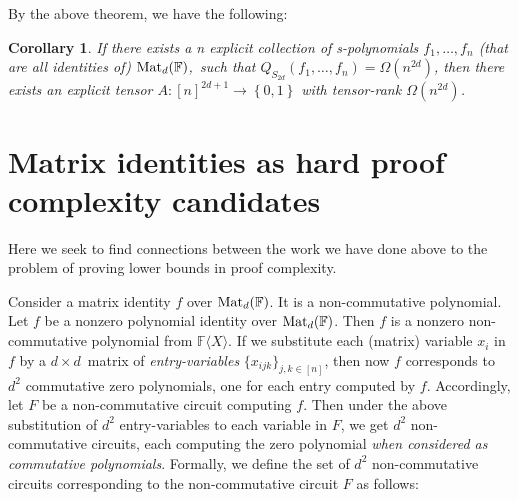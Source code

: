\documentclass[12pt,reqno]{article}
\newtheorem{corollary}[theorem]{Corollary}
\newcommand\F{\ensuremath{\mathbb F}}
\newcommand{\matd}{{\ensuremath{{\rm Mat}_d(\F)}}}
\newcommand{\freea}{\ensuremath{\F\langle X\rangle}}
\newcommand{\dbyd}{\ensuremath{d\times d}}
\newcommand{\iddofix}[2][]
{\todo[inline, size=\footnotesize, caption={#2}, #1, linecolor=green!70!white,         backgroundcolor=red!30!white,bordercolor=white]
{{#2}}}
\newcommand{\set}[1]{\left\{#1\right\}}
\newcommand{\nx}[1]{#1_1,\ldots,#1_{n}}
\begin{document}
By the above theorem, we have the following:
\begin{corollary}
  If there exists a n explicit  collection  of s-polynomials  $\nx{f}$ (that are all identities of)  \matd,\ such that $Q_{S_{2d}}(\nx{f}) = \Omega(n^{2d})$, then there exists an \textit{explicit} tensor $A:[n]^{2d+1}\rightarrow \set{0,1}$ with tensor-rank  $\Omega(n^{2d})$.
\end{corollary}







\section{Matrix identities as hard proof complexity candidates}\label{sec:app_rel_to_PC}
Here we seek to find connections between the work we have done above to the problem of proving lower bounds in proof
complexity.

Consider a matrix identity $f$ over \matd. It is a non-commutative polynomial. Let $f$ be a nonzero polynomial identity over \matd. Then $f$ is a nonzero non-commutative polynomial from \freea. If we substitute each (matrix) variable $x_i$ in $f$ by a \dbyd\ matrix of \emph{entry-variables} $\{x_{ijk}\}_{j,k\in[n]}$, then now $f$ corresponds to $d^2$ commutative zero polynomials, one for each entry computed by $f$. \iddofix{**phrase**} Accordingly, let $F$ be a non-commutative circuit computing $f$. Then under the above substitution of $d^2$ entry-variables to each variable in $F$, we get $d^2$  non-commutative circuits, each computing the zero polynomial \emph{when considered as commutative polynomials}.
 Formally, we define the set of $d^2$ non-commutative circuits corresponding to the non-commutative circuit $F$ as follows:
\end{document}
